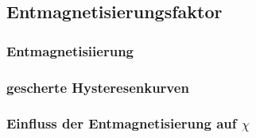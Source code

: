     \subsection{Entmagnetisierungsfaktor}

        \subsubsection*{Entmagnetisiierung}

        \subsubsection*{gescherte Hysteresenkurven}

        \subsubsection*{Einfluss der Entmagnetisierung auf $\chi$}

            
